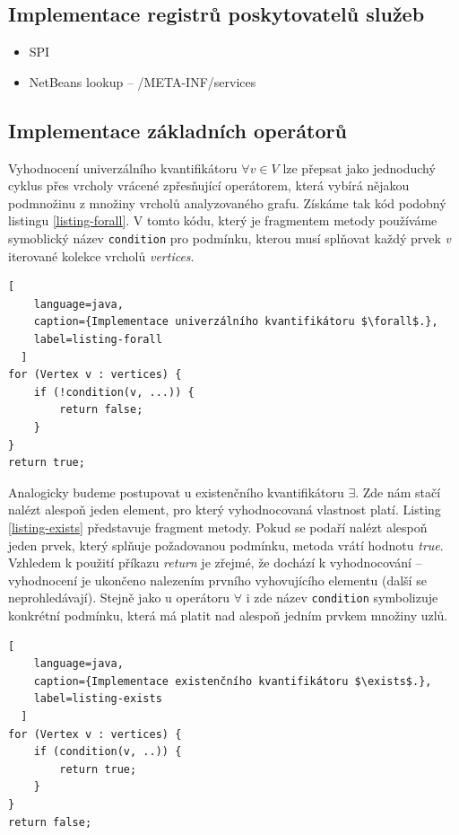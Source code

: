 \subsection{Implementace registrů poskytovatelů služeb}
\begin{itemize}
\item SPI
\item NetBeans lookup -- /META-INF/services
\end{itemize}

\subsection{Implementace základních operátorů}
Vyhodnocení univerzálního kvantifikátoru $\forall v \in V$ lze přepsat jako jednoduchý cyklus přes vrcholy vrácené zpřesňující operátorem, která vybírá nějakou podmnožinu z množiny vrcholů analyzovaného grafu. Získáme tak kód podobný listingu \ref{listing-forall}. V tomto kódu, který je fragmentem metody používáme symoblický název \verb+condition+ pro podmínku, kterou musí splňovat každý prvek \emph{v} iterované kolekce vrcholů \emph{vertices}.

\begin{lstlisting}[
    language=java,
    caption={Implementace univerzálního kvantifikátoru $\forall$.},
    label=listing-forall
  ]
for (Vertex v : vertices) {
    if (!condition(v, ...)) {
        return false;
    }
}
return true;
\end{lstlisting}

Analogicky budeme postupovat u existenčního kvantifikátoru $\exists$. Zde nám stačí nalézt alespoň jeden element, pro který vyhodnocovaná vlastnost platí. Listing \ref{listing-exists} představuje fragment metody. Pokud se podaří nalézt alespoň jeden prvek, který splňuje požadovanou podmínku, metoda vrátí hodnotu \emph{true}. Vzhledem k použití příkazu \emph{return} je zřejmé, že dochází k  vyhodnocování -- vyhodnocení je ukončeno nalezením prvního vyhovujícího elementu (další se neprohledávají). Stejně jako u operátoru $\forall$ i zde název \verb+condition+ symbolizuje konkrétní podmínku, která má platit nad alespoň jedním prvkem množiny uzlů.

\begin{lstlisting}[
    language=java,
    caption={Implementace existenčního kvantifikátoru $\exists$.},
    label=listing-exists
  ]
for (Vertex v : vertices) {
    if (condition(v, ..)) {
        return true;
    }
}
return false;
\end{lstlisting}


